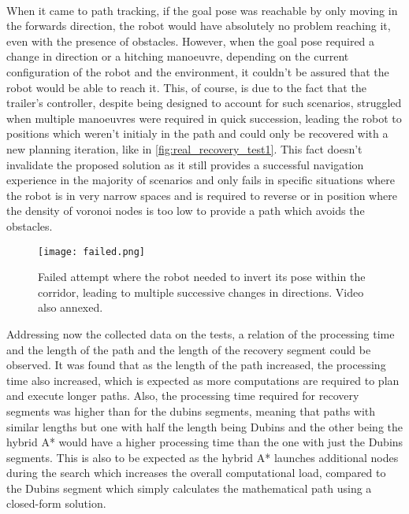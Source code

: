 \paragraph{} When it came to path tracking, if the goal pose was reachable by only moving 
in the forwards direction, the robot would have absolutely no problem reaching it, even with 
the presence of obstacles. However, when the goal pose required a change in direction 
or a hitching manoeuvre, depending on the current configuration of the robot and the 
environment, it couldn't be assured that the robot would be able to reach it. This, 
of course, is due to the fact that the trailer's controller, despite being designed to 
account for such scenarios, struggled when multiple manoeuvres were required in quick 
succession, leading the robot to positions which weren't initialy in the path and could only 
be recovered with a new planning iteration, like in \ref{fig:real_recovery_test1}. This fact doesn't invalidate the proposed 
solution as it still provides a successful navigation experience in the majority of 
scenarios and only fails in specific situations where the  robot is in very narrow spaces 
and is required to reverse or in position where the density of voronoi nodes is too low 
to provide a path which avoids the obstacles. 
\begin{figure}[h]
    \centering
    \texttt{[image: failed.png]}
    \caption{Failed attempt where the robot needed to invert its pose within the corridor, leading to multiple successive changes in directions. Video also annexed.}
    \label{fig:sim_obstacle_detection4}
\end{figure}

Addressing now the collected data on the tests, a relation of the processing time and the 
length of the path and the length of the recovery segment could be observed. It was found 
that as the length of the path increased, the processing time also increased, which is 
expected as more computations are required to plan and execute longer paths. Also, the processing 
time required for recovery segments was higher than for the dubins segments, meaning that 
paths with similar lengths but one with half the length being Dubins and the other being 
the hybrid A* would have a higher processing time than the one with just the Dubins segments. 
This is also to be expected as the hybrid A* launches additional nodes during the search which 
increases the overall computational load, compared to the Dubins segment which simply calculates 
the mathematical path using a closed-form solution.

